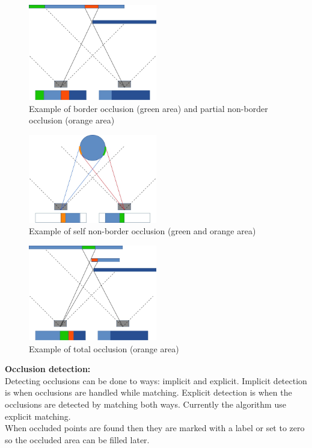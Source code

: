 \begin{figure}
  \centering
  \includegraphics[width=0.5\textwidth]{images/borNParOcc}
  \caption{Example of border occlusion (green area) and partial non-border occlusion (orange area)}
  \label{fig:borNParOcc}
\end{figure}

\begin{figure}
  \centering
  \includegraphics[width=0.5\textwidth]{images/selfOcc}
  \caption{Example of self non-border occlusion (green and orange area)}
  \label{fig:selfOcc}
\end{figure}

\begin{figure}
  \centering
  \includegraphics[width=0.5\textwidth]{images/compOcc}
  \caption{Example of total occlusion (orange area)}
  \label{fig:totalOcc}
\end{figure}

\textbf{Occlusion detection:}\\
Detecting occlusions can be done to ways: implicit and explicit. Implicit detection is when occlusions are handled while matching. Explicit detection is when the occlusions are detected by matching both ways. Currently the algorithm use explicit matching.\\
When occluded points are found then they are marked with a label or set to zero so the occluded area can be filled later.

